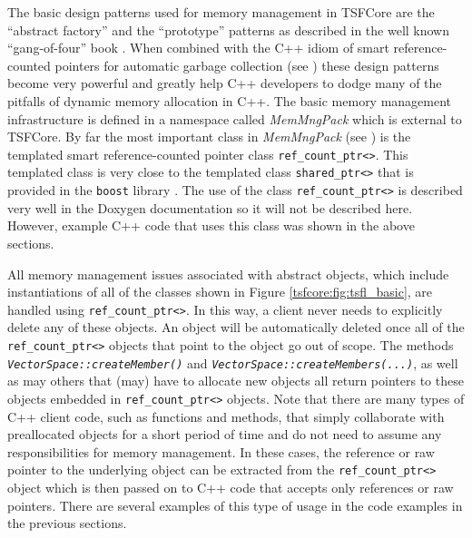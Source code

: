 The basic design patterns used for memory management in TSFCore are the
``abstract factory'' and the ``prototype'' patterns as described in
the well known ``gang-of-four'' book \cite{ref:gama_et_al_1995}.  When
combined with the C++ idiom of smart reference-counted pointers for
automatic garbage collection (see \cite[Items 28-29]{ref:meyers_1996})
these design patterns become very powerful and greatly help C++
developers to dodge many of the pitfalls of dynamic memory allocation
in C++.  The basic memory management infrastructure is defined in a
namespace called \textit{MemMngPack} which is external to TSFCore.  By
far the most important class in \textit{MemMngPack} (see
\cite{ref:moochodevguide}) is the templated smart reference-counted pointer class
\texttt{ref\_count\_ptr<>}.  This templated class is very close to the
templated class \texttt{shared\_ptr<>} that is provided in the
\texttt{boost} library \cite{ref:boost}.  The use of the class
\texttt{ref\_count\_ptr<>} is described very well in the Doxygen
documentation so it will not be described here.  However, example C++
code that uses this class was shown in the above sections.

All memory management issues associated with abstract objects, which
include instantiations of all of the classes shown in Figure
\ref{tsfcore:fig:tsfl_basic}, are handled using
\texttt{ref\_count\_ptr<>}.  In this way, a client never needs to
explicitly delete any of these objects.  An object will be
automatically deleted once all of the
\texttt{ref\_count\_ptr<>} objects that point to the object go out of
scope.  The methods
\texttt{\textit{VectorSpace\-::createMember()}} and
\texttt{\textit{VectorSpace\-::createMembers(...)}}, as well as may others that
(may) have to allocate new objects all return pointers to these
objects embedded in \texttt{ref\_count\_ptr<>} objects.  Note that
there are many types of C++ client code, such as functions and
methods, that simply collaborate with preallocated objects for a short
period of time and do not need to assume any responsibilities for
memory management.  In these cases, the reference or raw pointer to the
underlying object can be extracted from the
\texttt{ref\_count\_ptr<>} object which is then passed on to C++ code
that accepts only references or raw pointers.  There are several
examples of this type of usage in the code examples in the previous
sections.

